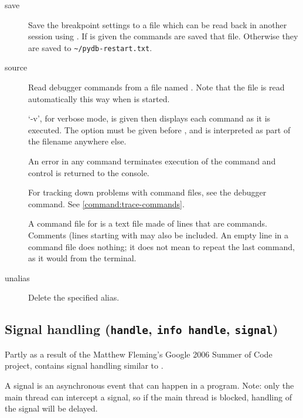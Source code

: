 \begin{description}
\item[save  ]\label{command:save}

Save the breakpoint settings to a file which can be read back in
another session using . If  is given the
commands are saved that file. Otherwise they are saved to
\verb|~/pydb-restart.txt|.


\item[source  ]\label{command:source}

Read debugger commands from a file named .
Note that the file  is read automatically
this way when  is started.

 `-v', for verbose mode, is given then  displays each command
as it is executed.  The option must be given before , and is
interpreted as part of the filename anywhere else.

An error in any command terminates execution of the command and
control is returned to the console.

For tracking down problems with command files, see the  debugger command. See \ref{command:trace-commands}. 

A command file for  is a text file made of lines that are
 commands.  Comments (lines starting with \code{\#} may also be
included.  An empty line in a command file does nothing; it does not
mean to repeat the last command, as it would from the terminal.

\item[unalias ]\label{command:unalias}

Delete the specified alias.

\end{description}

\subsection{Signal handling ({\tt handle}, {\tt info handle}, {\tt signal})\label{subsection-signal}}

Partly as a result of the Matthew Fleming's Google 2006 Summer of Code
project,  contains signal handling similar to .

A signal is an asynchronous event that can happen in a program.  Note:
only the main thread can intercept a signal, so if the main thread is
blocked, handling of the signal will be delayed.

